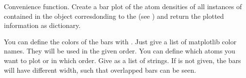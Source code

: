 \documentclass[letterpaper,10pt,english]{sphinxmanual}
\begin{document}

\begin{fulllineitems}
\label{\detokenize{modules-api/samplerepresentation:SampleRepresentation.plotAtomDensity}}
Convenience function. Create a bar plot of the atom densities of all instances of {\hyperref[\detokenize{modules-api/samplerepresentation:SampleRepresentation.AtomLayerObject}]{}} contained in the {\hyperref[\detokenize{modules-api/samplerepresentation:SampleRepresentation.Heterostructure}]{}} object  corresdonding to the  (see {\hyperref[\detokenize{modules-api/parameters:module-Parameters}]{}}) and return the plotted information as dictionary.

You can  define the colors of the bars with . Just give a list of matplotlib color names. They will be used in the given order.
You can define which atoms you want to plot or in which order. Give  as a list of strings. If  is not given, the bars will have different width, such that overlapped bars can be seen.

\end{fulllineitems}

\end{document}

